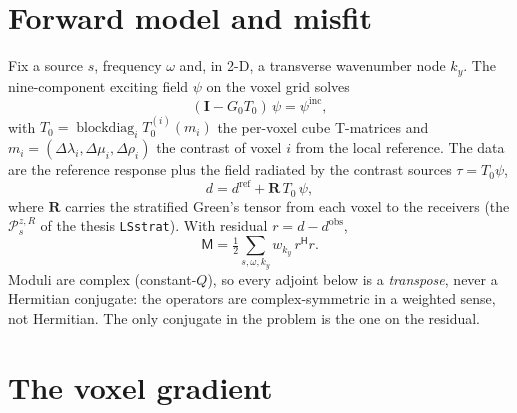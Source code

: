 \documentclass[11pt,a4paper]{article}
\newcommand{\Tz}{T_0}
\newcommand{\Gz}{G_0}
\newcommand{\bR}{\mathbf{R}}
\newcommand{\bI}{\mathbf{I}}
\begin{document}
\section{Forward model and misfit}\label{sec:forward}

Fix a source $s$, frequency $\omega$ and, in 2\textonehalf-D, a transverse wavenumber node
$k_y$. The nine-component exciting field $\psi$ on the voxel grid solves
\begin{equation}\label{eq:fl}
  (\bI - \Gz\Tz)\,\psi = \psi^{\mathrm{inc}},
\end{equation}
with $\Tz = \operatorname{blockdiag}_i \Tz^{(i)}(m_i)$ the per-voxel cube T-matrices and
$m_i = (\Delta\lambda_i,\Delta\mu_i,\Delta\rho_i)$ the contrast of voxel $i$ from the local
reference. The data are the reference response plus the field radiated by the contrast sources
$\tau = \Tz\psi$,
\begin{equation}\label{eq:data}
  d = d^{\mathrm{ref}} + \bR\,\Tz\,\psi ,
\end{equation}
where $\bR$ carries the stratified Green's tensor from each voxel to the receivers (the
$\mathcal{P}^{z,R}_{s}$ of the thesis \texttt{LSstrat}). With residual $r = d - d^{\mathrm{obs}}$,
\begin{equation}\label{eq:misfit}
  \mathsf{M} = \tfrac12 \sum_{s,\omega,k_y} w_{k_y}\, r^{\mathsf H} r .
\end{equation}
Moduli are complex (constant-$Q$), so every adjoint below is a \emph{transpose}, never a
Hermitian conjugate: the operators are complex-symmetric in a weighted sense, not Hermitian. The
only conjugate in the problem is the one on the residual.

\section{The voxel gradient}\label{sec:voxgrad}
\end{document}
